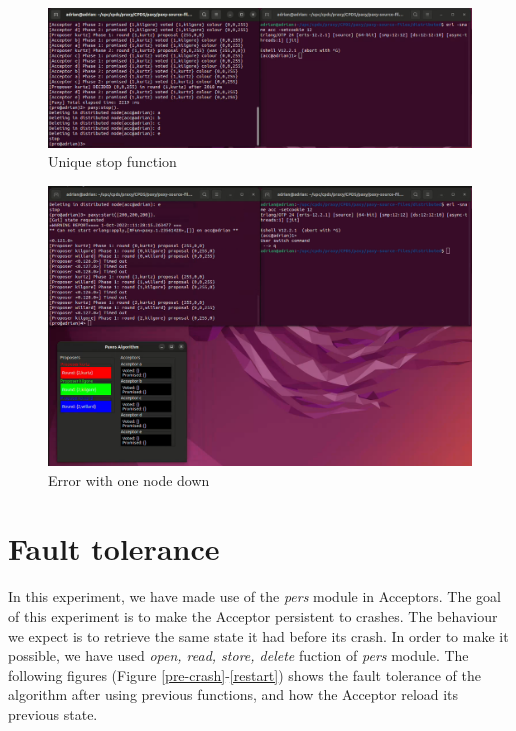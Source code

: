 \documentclass[a4paper, 10pt]{article}
\begin{document}
\begin{figure}[H]
  \centering
  \includegraphics[width=.65\linewidth]{images/stop.png}
    \caption{Unique stop function}
    \label{stop}
\end{figure} 



\begin{figure}[H]
  \centering
  \includegraphics[width=.85\linewidth]{images/remoteFailExecution.png}
    \caption{Error with one node down}
    \label{error}
\end{figure} 

\clearpage

\section{Fault tolerance}

In this experiment, we have made use of the \textit{pers} module in Acceptors. The goal of this experiment is to make the Acceptor persistent to crashes. The behaviour we expect is to retrieve the same state it had before its crash. In order to make it possible, we have used \textit{open, read, store, delete} fuction of \textit{pers} module. The following figures (Figure \ref{pre-crash}-\ref{restart}) shows the fault tolerance of the algorithm after using previous functions, and how the Acceptor reload its previous state.
\end{document}

